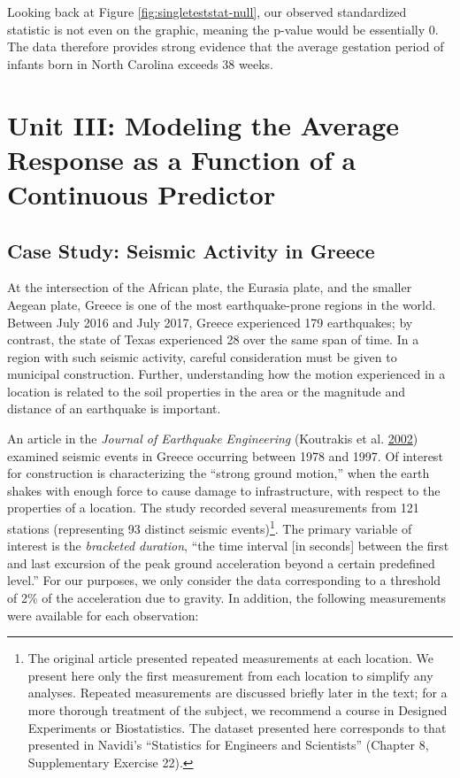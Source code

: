 \documentclass[]{book}
\let\rmarkdownfootnote\footnote%
\def\footnote{\protect\rmarkdownfootnote}
\theoremstyle{plain}
\theoremstyle{mydefn}
\theoremstyle{myexmpl}
\theoremstyle{remark}
\begin{document}
Looking back at Figure \ref{fig:singleteststat-null}, our observed
standardized statistic is not even on the graphic, meaning the p-value
would be essentially 0. The data therefore provides strong evidence that
the average gestation period of infants born in North Carolina exceeds
38 weeks.

\part{Unit III: Modeling the Average Response as a Function
of a Continuous
Predictor}\label{part-unit-iii-modeling-the-average-response-as-a-function-of-a-continuous-predictor}

\hypertarget{CaseGreece}{\chapter{Case Study: Seismic Activity in
Greece}\label{CaseGreece}}

At the intersection of the African plate, the Eurasia plate, and the
smaller Aegean plate, Greece is one of the most earthquake-prone regions
in the world. Between July 2016 and July 2017, Greece experienced 179
earthquakes; by contrast, the state of Texas experienced 28 over the
same span of time. In a region with such seismic activity, careful
consideration must be given to municipal construction. Further,
understanding how the motion experienced in a location is related to the
soil properties in the area or the magnitude and distance of an
earthquake is important.

An article in the \emph{Journal of Earthquake Engineering} (Koutrakis et
al. \protect\hyperlink{ref-Koutrakis2002}{2002}) examined seismic events
in Greece occurring between 1978 and 1997. Of interest for construction
is characterizing the ``strong ground motion,'' when the earth shakes
with enough force to cause damage to infrastructure, with respect to the
properties of a location. The study recorded several measurements from
121 stations (representing 93 distinct seismic events)\footnote{The
  original article presented repeated measurements at each location. We
  present here only the first measurement from each location to simplify
  any analyses. Repeated measurements are discussed briefly later in the
  text; for a more thorough treatment of the subject, we recommend a
  course in Designed Experiments or Biostatistics. The dataset presented
  here corresponds to that presented in Navidi's ``Statistics for
  Engineers and Scientists'' (Chapter 8, Supplementary Exercise 22).}.
The primary variable of interest is the \emph{bracketed duration}, ``the
time interval {[}in seconds{]} between the first and last excursion of
the peak ground acceleration beyond a certain predefined level.'' For
our purposes, we only consider the data corresponding to a threshold of
2\% of the acceleration due to gravity. In addition, the following
measurements were available for each observation:
\end{document}
